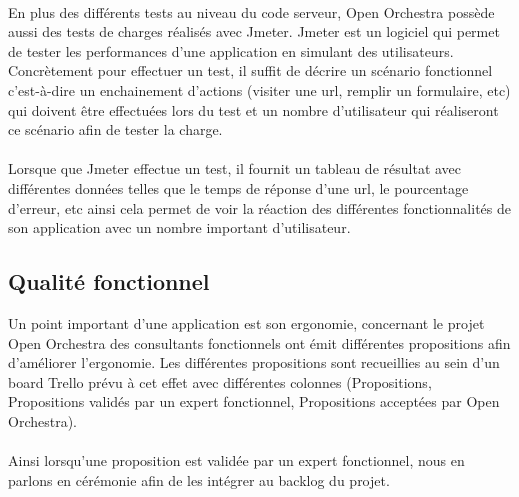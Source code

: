   \paragraph{}
  En plus des différents tests au niveau du code serveur, Open Orchestra possède aussi des tests de charges réalisés avec Jmeter. Jmeter est un logiciel qui permet de tester les performances d'une application en simulant des utilisateurs. Concrètement pour effectuer un test, il suffit de décrire un scénario fonctionnel c'est-à-dire un enchainement d'actions (visiter une url, remplir un formulaire, etc) qui doivent être effectuées lors du test et un nombre d'utilisateur qui réaliseront ce scénario afin de tester la charge.
  
  \paragraph{}
 \label{jmeter} 
  Lorsque que Jmeter effectue un test, il fournit un tableau de résultat avec différentes données telles que le temps de réponse d'une url, le pourcentage d'erreur, etc ainsi cela permet de voir la réaction des différentes fonctionnalités de son application avec un nombre important d'utilisateur.
\subsection{Qualité fonctionnel}
Un point important d'une application est son ergonomie, concernant le projet Open Orchestra des consultants fonctionnels ont émit différentes propositions afin d'améliorer l'ergonomie. Les différentes propositions sont recueillies au sein d'un board Trello prévu à cet effet avec différentes colonnes (Propositions, Propositions validés par un expert fonctionnel, Propositions acceptées par Open Orchestra). 
  \paragraph{}
  Ainsi lorsqu'une proposition est validée par un expert fonctionnel, nous en parlons en cérémonie afin de les intégrer au backlog du projet. 